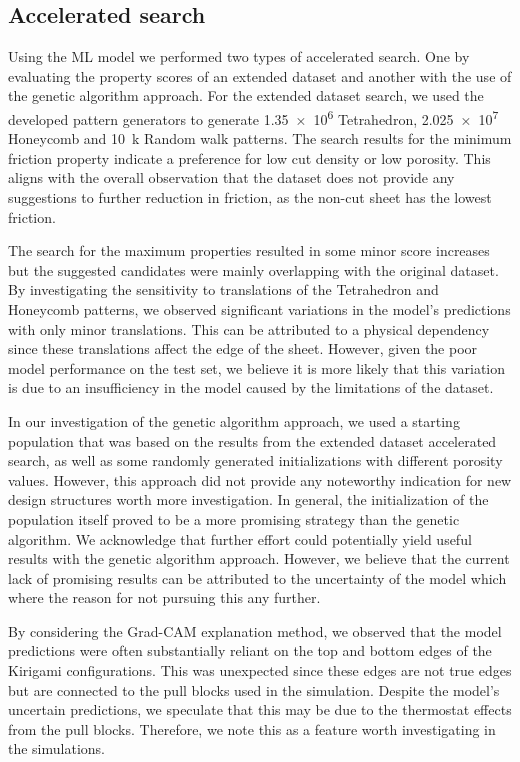 \subsection{Accelerated search}
Using the \acrshort{ML} model we performed two types of accelerated search. One
by evaluating the property scores of an extended dataset and another with the
use of the genetic algorithm approach. For the extended dataset search, we used
the developed pattern generators to generate \num{1.35e6} Tetrahedron,
\num{2.025e7} Honeycomb and \SI{10}{k} Random walk patterns. The search results
for the minimum friction property indicate a preference for low cut density or
low porosity. This aligns with the overall observation that the dataset does not
provide any suggestions to further reduction in friction, as the non-cut sheet
has the lowest friction. 

The search for the maximum properties resulted in some minor score increases but
the suggested candidates were mainly overlapping with the original dataset. By investigating the sensitivity to translations of the Tetrahedron and Honeycomb patterns, we observed significant variations in the model's predictions with only minor translations. This can be attributed to a physical dependency since these translations affect the edge of the sheet. However, given the poor model performance on the test set, we believe it is more likely that this variation is due to an insufficiency in the model caused by the limitations of the dataset.

In our investigation of the genetic algorithm approach, we used a starting population that was based on the results from the extended dataset accelerated search, as well as some randomly generated initializations with different porosity values. However, this approach did not provide any noteworthy
indication for new design structures worth more investigation. In general, the
initialization of the population itself proved to be a more promising strategy
than the genetic algorithm. We acknowledge that further effort could potentially yield useful results with the genetic algorithm approach. However, we believe that the current lack of promising results can be attributed to the uncertainty of the model which where the reason for not pursuing this any further.

By considering the Grad-CAM explanation method, we observed that the model predictions were often substantially reliant on the top and bottom edges of the Kirigami configurations. This was unexpected since these edges are not true edges but are connected to the pull blocks used in the simulation. Despite the model's uncertain predictions, we speculate that this may be due to the thermostat effects from the pull blocks. Therefore, we note this as a feature worth investigating in the simulations.



